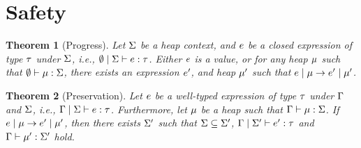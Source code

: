 \documentclass[10pt]{scrartcl}
\newtheorem{theorem}{Theorem}
\begin{document}
\section{Safety}
\label{sec:safety}

\begin{theorem}[Progress]
  Let $\Sigma$ be a heap context, and $e$ be a closed expression of type $\tau$ under $\Sigma$, i.e., $\emptyset\;|\;\Sigma \vdash{} e : \tau$. Either $e$ is a value, or for any heap $\mu$ such that $\emptyset \vdash{} \mu : \Sigma$, there exists an expression $e'$, and heap $\mu'$ such that $e\;|\;\mu \to e'\;|\;\mu'$.
\end{theorem}

\begin{theorem}[Preservation]
  Let $e$ be a well-typed expression of type $\tau$ under $\Gamma$ and $\Sigma$, i.e., $\Gamma\;|\;\Sigma \vdash{} e : \tau$. Furthermore, let $\mu$ be a heap such that $\Gamma \vdash{} \mu : \Sigma$. If $e\;|\;\mu \to e'\;|\;\mu'$, then there exists $\Sigma'$ such that $\Sigma \subseteq \Sigma'$, $\Gamma\;|\;\Sigma' \vdash{} e' : \tau$ and $\Gamma \vdash{} \mu' : \Sigma'$ hold.
\end{theorem}
\end{document}
